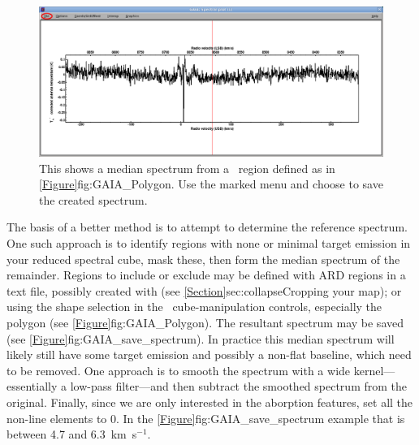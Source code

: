 \documentclass[11pt,oneside,chapters]{starlink}
\newcommand{\kms}{\mbox{$\,$km~s$^{-1}$}}   %
\newcommand{\kms}{\,km~s$^{-1}$}   %
\begin{document}
\begin{figure}[h!] \begin{center}
\includegraphics[width=0.9\linewidth]{sc20_refspec_gaia_save}
\caption[Using \gaia\ to define background
regions]{\label{fig:GAIA_save_spectrum}
  This shows a median spectrum from a \gaia\ region defined
  as in \cref{Figure}{fig:GAIA_Polygon}{}.  Use the marked
   menu and choose  to save the
   created spectrum.}
\end{center}
\end{figure}

The basis of a better method is to attempt to determine the reference
spectrum.  One such approach is to identify regions with none or
minimal target emission in your reduced spectral cube, mask these,
then form the median spectrum of the remainder.  Regions to include or
exclude may be defined with ARD regions in a text file, possibly
created with \gaia (see \cref{Section}{sec:collapse}{Cropping your
map}); or using the shape selection in the \gaia\ cube-manipulation
controls, especially the polygon (see
\cref{Figure}{fig:GAIA_Polygon}{}).  The resultant spectrum may be
saved (see \cref{Figure}{fig:GAIA_save_spectrum}{}). In practice this
median spectrum will likely still have some target emission and
possibly a non-flat baseline, which need to be removed. One approach
is to smooth the spectrum with a wide kernel---essentially a low-pass
filter---and then subtract the smoothed spectrum from the original.
Finally, since we are only interested in the aborption features, set
all the non-line elements to 0.  In the
\cref{Figure}{fig:GAIA_save_spectrum}{} example that is between 4.7
and 6.3 \kms.

\begin{terminalv}
\end{terminalv}
\end{document}
